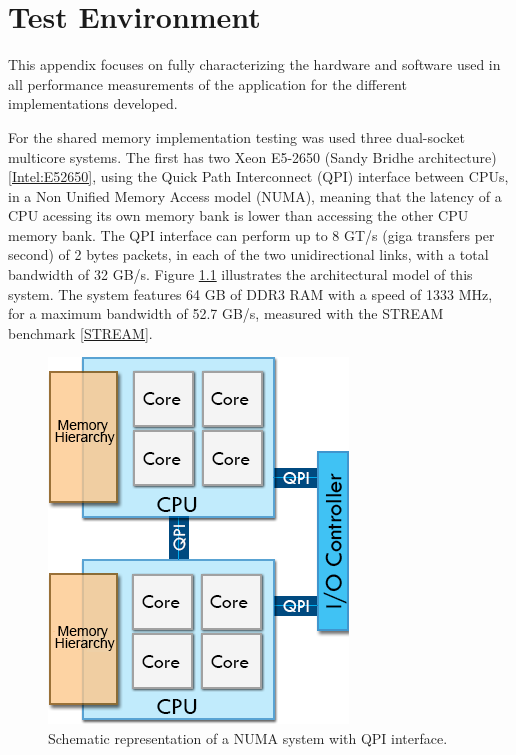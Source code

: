 \appendix
{}
\chapter{Test Environment}
\label{App:TestEnv}

This appendix focuses on fully characterizing the hardware and software used in all performance measurements of the application for the different implementations developed.

For the shared memory implementation testing was used three dual-socket multicore systems. The first has two \intel Xeon E5-2650 (Sandy Bridhe architecture) \ref{Intel:E52650}, using the Quick Path Interconnect (QPI) interface between CPUs, in a Non Unified Memory Access model (NUMA), meaning that the latency of a CPU acessing its own memory bank is lower than accessing the other CPU memory bank. The QPI interface can perform up to 8 GT/s (giga transfers per second) of 2 bytes packets, in each of the two unidirectional links, with a total bandwidth of 32 GB/s. Figure \ref{fig:SystemModel} illustrates the architectural model of this system. The system features 64 GB of DDR3 RAM with a speed of 1333 MHz, for a maximum bandwidth of 52.7 GB/s, measured with the STREAM benchmark \ref{STREAM}.

\begin{figure}[!htp]
	\begin{center}
		\includegraphics[scale=0.5]{../../common/img/numa_qpi.png}
		\caption{Schematic representation of a NUMA system with QPI interface.}
		\label{fig:SystemModel}
	\end{center}
\end{figure}

